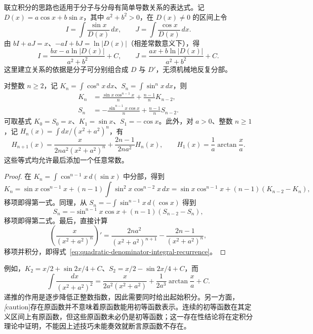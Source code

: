 联立积分的思路也适用于分子与分母有简单导数关系的表达式。记 $D(x)=a\cos x+b\sin x$，其中 $a^2+b^2>0$，在 $D(x)\neq0$ 的区间上令
\[
    I=\int\frac{\sin x}{D(x)}\,dx,\qquad
    J=\int\frac{\cos x}{D(x)}\,dx.
\]
由 $bI+aJ=x$、$-aI+bJ=\ln|D(x)|$（相差常数意义下），得
\[
    I=\frac{bx-a\ln|D(x)|}{a^2+b^2}+C,
    \qquad J=\frac{ax+b\ln|D(x)|}{a^2+b^2}+C.
\]
这里建立关系的依据是分子可分别组合成 $D$ 与 $D'$，无须机械地反复分部。

\begin{proposition}[常用积分递推公式]
\label{prop:power-integral-recurrences}
对整数 $n\geq2$，记 $K_n=\int\cos^n x\,dx$、$S_n=\int\sin^n x\,dx$，则
\begin{align}
    K_n&=\frac{\sin x\cos^{n-1}x}{n}+\frac{n-1}{n}K_{n-2},
       \label{eq:cosine-power-integral-recurrence}\\
    S_n&=-\frac{\sin^{n-1}x\cos x}{n}+\frac{n-1}{n}S_{n-2}.
       \label{eq:sine-power-integral-recurrence}
\end{align}
可取基式 $K_0=S_0=x$、$K_1=\sin x$、$S_1=-\cos x$。此外，对 $a>0$、整数 $n\geq1$，记 $H_n(x)=\int dx/(x^2+a^2)^n$，有
\begin{equation}
    H_{n+1}(x)=\frac{x}{2na^2(x^2+a^2)^n}
          +\frac{2n-1}{2na^2}H_n(x),
    \qquad H_1(x)=\frac1a\arctan\frac xa.
    \label{eq:quadratic-denominator-integral-recurrence}
\end{equation}
这些等式均允许最后添加一个任意常数。
\end{proposition}

\begin{proof}
在 $K_n=\int\cos^{n-1}x\,d(\sin x)$ 中分部，得到
\[
    K_n=\sin x\cos^{n-1}x
          +(n-1)\int\sin^2x\cos^{n-2}x\,dx
       =\sin x\cos^{n-1}x+(n-1)(K_{n-2}-K_n),
\]
移项即得第一式。同理，从 $S_n=-\int\sin^{n-1}x\,d(\cos x)$ 得到
\[
    S_n=-\sin^{n-1}x\cos x+(n-1)(S_{n-2}-S_n),
\]
移项即得第二式。最后，直接计算
\[
    \left(\frac{x}{(x^2+a^2)^n}\right)'
       =\frac{2na^2}{(x^2+a^2)^{n+1}}
           -\frac{2n-1}{(x^2+a^2)^n},
\]
移项并积分，即得式~\eqref{eq:quadratic-denominator-integral-recurrence}。
\end{proof}

例如，$K_2=x/2+\sin2x/4+C$、$S_2=x/2-\sin2x/4+C$，而
\[
    \int\frac{dx}{(x^2+a^2)^2}
       =\frac{x}{2a^2(x^2+a^2)}+\frac1{2a^3}\arctan\frac xa+C.
\]
递推的作用是逐步降低正整数指数，因此需要同时给出起始积分。另一方面，\emph[caution]{存在原函数并不意味着原函数能用初等函数表示。}连续的初等函数在其定义区间上有原函数，但这些原函数未必仍是初等函数；这一存在性结论将在定积分理论中证明，不能因上述技巧未能奏效就断言原函数不存在。


